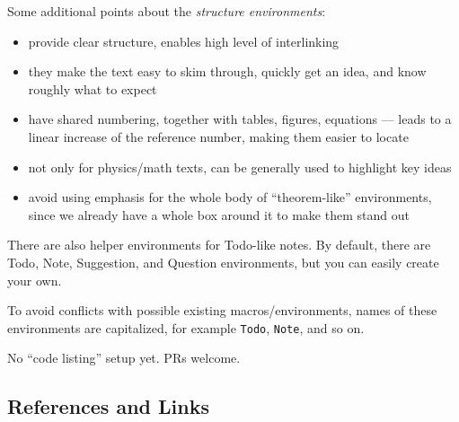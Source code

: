 Some additional points about the \emph{structure environments}:
\begin{itemize}
    \item provide clear structure, enables high level of interlinking
    \item they make the text easy to skim through, quickly get an idea, and know roughly what to expect
    \item have shared numbering, together with tables, figures, equations --- leads to a linear increase of the reference number, making them easier to locate
    \item not only for physics/math texts, can be generally used to highlight key ideas
    \item avoid using emphasis for the whole body of \enquote{theorem-like} environments, since we already have a whole box around it to make them stand out
\end{itemize}
\vspace{1ex}

\begin{remark}
    There are also helper environments for \textsf{Todo}-like notes.
    By default, there are \textsf{Todo}, \textsf{Note}, \textsf{Suggestion}, and \textsf{Question} environments, but you can easily create your own.

    To avoid conflicts with possible existing macros/environments, names of these environments are capitalized, for example \texttt{Todo}, \texttt{Note}, and so on.
\end{remark}

\begin{Note}
    No \enquote{code listing} setup yet.
    PRs welcome.
\end{Note}

\subsection{References and Links}%
\label{sub:References Links}

